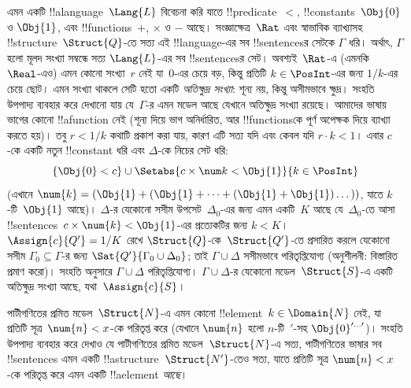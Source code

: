 \documentclass[../../../include/open-logic-section]{subfiles}
\begin{document}
{\begin{ex}
এমন একটি !!a{language}~$\Lang{L}$ বিবেচনা করি যাতে !!{predicate}~$<$,
!!{constant}s~$\Obj{0}$ ও $\Obj{1}$, এবং !!{function}s~$+$, $\times$ ও
$-$ আছে। সংজ্ঞাক্ষেত্র~$\Rat$ এবং স্বাভাবিক ব্যাখ্যাসহ
!!{structure}~$\Struct{Q}$-তে সত্য এই !!{language}-এর সব !!{sentence}sর সেটকে
$\Gamma$ ধরি। অর্থাৎ, $\Gamma$ হলো মূলদ সংখ্যা সম্বন্ধে সত্য
$\Lang{L}$-এর সব !!{sentence}sর সেট। অবশ্যই~$\Rat$-এ (এমনকি~$\Real$-এও)
এমন কোনো সংখ্যা~$r$ নেই যা~$0$-এর চেয়ে বড়, কিন্তু প্রতিটি $k \in
\PosInt$-এর জন্য $1/k$-এর চেয়ে ছোট। এমন সংখ্যা থাকলে সেটি হতো একটি
\emph{অতিক্ষুদ্র সংখ্যা}: শূন্য নয়, কিন্তু অসীমভাবে ক্ষুদ্র। সংহতি
উপপাদ্য ব্যবহার করে দেখানো যায় যে~$\Gamma$-র এমন মডেল আছে যেখানে
অতিক্ষুদ্র সংখ্যা রয়েছে। আমাদের ভাষায় ভাগের কোনো !!a{function} নেই
(শূন্য দিয়ে ভাগ অনির্ধারিত, আর !!{function}sকে পূর্ণ অপেক্ষক দিয়ে
ব্যাখ্যা করতে হয়)। তবু $r < 1/k$ কথাটি প্রকাশ করা যায়, কারণ এটি সত্য
যদি এবং কেবল যদি $r \cdot k < 1$। এবার $c$-কে একটি নতুন !!{constant}
ধরি এবং $\Delta$-কে নিচের সেট ধরি:
\[
\{\Obj{0} < c\}
\cup \Setabs{ c \times \num k < \Obj{1} }{k \in \PosInt}
\]
(এখানে $\num{k} = (\Obj{1} + (\Obj{1} + \dots + (\Obj{1} +
\Obj{1})\dots))$, যাতে $k$-টি~$\Obj{1}$ আছে)। $\Delta$-র যেকোনো সসীম
উপসেট~$\Delta_0$-এর জন্য এমন একটি~$K$ আছে যে~$\Delta_0$-তে আসা
!!{sentence}s~$c \times \num{k} < \Obj{1}$-এর প্রত্যেকটির জন্য $k < K$।
$\Assign{c}{Q'} = 1/K$ রেখে $\Struct{Q}$-কে~$\Struct{Q'}$-তে প্রসারিত
করলে যেকোনো সসীম $\Gamma_0 \subseteq \Gamma$-র জন্য
$\Sat{Q'}{\Gamma_0 \cup \Delta_0}$; তাই $\Gamma \cup \Delta$ সসীমভাবে
পরিতৃপ্তিযোগ্য (অনুশীলনী: বিস্তারিত প্রমাণ করো)। সংহতি অনুসারে $\Gamma
\cup \Delta$ পরিতৃপ্তিযোগ্য। $\Gamma \cup \Delta$-র যেকোনো
মডেল~$\Struct{S}$-এ একটি অতিক্ষুদ্র সংখ্যা আছে, যথা~$\Assign{c}{S}$।
\end{ex}
}{}

\begin{prob}
পাটীগণিতের প্রমিত মডেল~$\Struct{N}$-এ এমন কোনো
!!{element}~$k \in \Domain{N}$ নেই, যা প্রতিটি সূত্র~$\num{n} < x$-কে
পরিতৃপ্ত করে (যেখানে $\num{n}$ হলো $n$-টি~$\prime$-সহ
$\Obj{0}^{\prime\dots\prime}$)। সংহতি উপপাদ্য ব্যবহার করে দেখাও যে
পাটীগণিতের প্রমিত মডেল~$\Struct{N}$-এ সত্য, পাটীগণিতের ভাষার
সব
!!{sentence}s এমন একটি !!a{structure}~$\Struct{N'}$-তেও সত্য, যাতে
প্রতিটি সূত্র $\num{n} < x$-কে পরিতৃপ্ত করে এমন একটি !!a{element}
\emph{আছে}।
\end{prob}
\tagendprob
\end{document}
